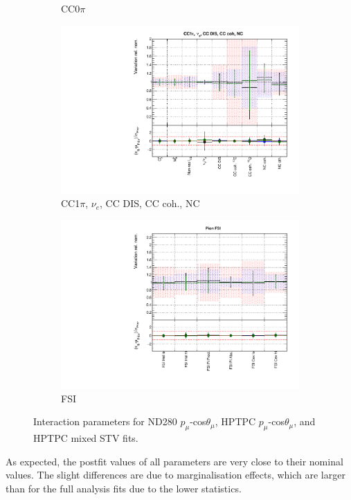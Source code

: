 \begin{figure}
\begin{subfigure}{0.49\textwidth}
  \caption{CC0$\pi$}
\end{subfigure}
\begin{subfigure}{0.49\textwidth}
  \centering
  \includegraphics[width=0.95\linewidth]{figs/hptpcfitsxsec_2}
  \caption{CC1$\pi$, $\nu_e$, CC DIS, CC coh., NC}
\end{subfigure}
\begin{subfigure}{0.49\textwidth}
  \centering
  \includegraphics[width=0.95\linewidth]{figs/hptpcfitsxsec_3}
  \caption{FSI}
\end{subfigure}
\caption{Interaction parameters for ND280 $p_{\mu}$-cos$\theta_{\mu}$, HPTPC $p_{\mu}$-cos$\theta_{\mu}$, and HPTPC mixed STV fits.}
\label{fig:hptpcxsec}
\end{figure}

As expected, the postfit values of all parameters are very close to their nominal values. The slight differences are due to marginalisation effects, which are larger than for the full analysis fits due to the lower statistics.

